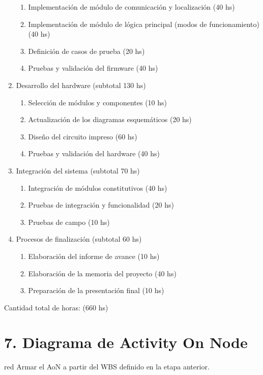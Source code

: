 \documentclass[11pt]{charter}
\begin{document}
\begin{enumerate}
\begin{enumerate}
  \item Implementación de módulo de comunicación y localización \hfill (40 hs)
  \item Implementación de módulo de lógica principal (modos de funcionamiento) \hfill (40 hs)
  \item Definición de casos de prueba \hfill (20 hs)
  \item Pruebas y validación del firmware \hfill (40 hs)
  \end{enumerate}
\item Desarrollo del hardware \hfill (subtotal 130 hs)
  \begin{enumerate}
  \item Selección de módulos y componentes \hfill (10 hs)
  \item Actualización de los diagramas esquemáticos \hfill (20 hs)
  \item Diseño del circuito impreso \hfill (60 hs)
  \item Pruebas y validación del hardware \hfill (40 hs)
  \end{enumerate}
\item Integración del sistema \hfill (subtotal 70 hs)
  \begin{enumerate}
  \item Integración de módulos constitutivos \hfill (40 hs)
  \item Pruebas de integración y funcionalidad \hfill (20 hs)
  \item Pruebas de campo \hfill (10 hs)
  \end{enumerate}
\item Procesos de finalización \hfill (subtotal 60 hs)
  \begin{enumerate}
  \item Elaboración del informe de avance \hfill (10 hs)
  \item Elaboración de la memoria del proyecto \hfill (40 hs)
  \item Preparación de la presentación final \hfill (10 hs)
  \end{enumerate}
\end{enumerate}

Cantidad total de horas: (660 hs)

\section{7. Diagrama de Activity On Node}
\label{sec:AoN}

\begin{consigna}{red}
Armar el AoN a partir del WBS definido en la etapa anterior. 



\end{consigna}
\end{document}
